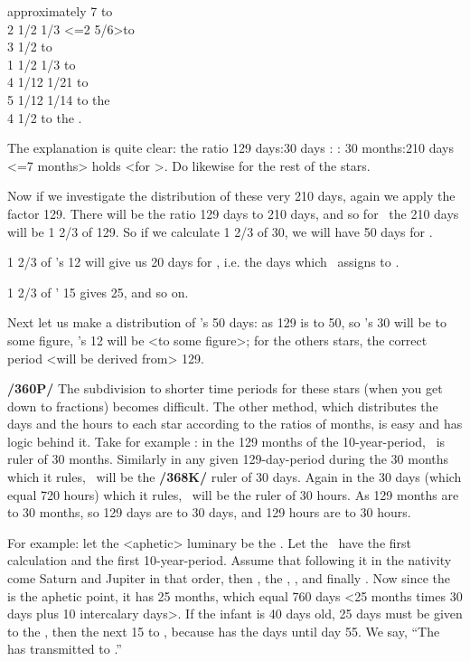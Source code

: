 \noindent approximately 7 to \Saturn \\
2 1/2 1/3 <=2 5/6>to \Jupiter \\
3 1/2 to \Mars \\
1 1/2 1/3 to \Venus \\
4 1/12 1/21 to \Mercury \\
5 1/12 1/14 to the \Moon \\
4 1/2 to the \Sun. 

The explanation is quite clear: 
the ratio 129 days:30 days : : 30 months:210 days <=7 months>
holds <for \Saturn>. Do likewise for the rest of the stars.

Now if we investigate the distribution of these very 210 days, again we apply the factor 129. There will be the ratio 129 days to 210 days, and so for \Saturn\, the 210 days will be 1 2/3 of 129. So if we
calculate 1 2/3 of 30, we will have 50 days for \Saturn. 

1 2/3 of \Jupiter’s 12 will give us 20 days for \Jupiter, i.e. the days which \Saturn\, assigns to \Jupiter. 

1 2/3 of \Mars’ 15 gives 25, and so on.

Next let us make a distribution of \Saturn’s 50 days: as 129 is to 50, so \Saturn’s 30 will be to some figure, \Jupiter’s 12 will be <to some figure>; for the others stars, the correct period <will be derived from> 129.

\textbf{/360P/} The subdivision to shorter time periods for these stars (when you get down to fractions) becomes difficult. The other method, which distributes the days and the hours to each star according to the ratios of months, is easy and has logic behind it. Take for example \Saturn: in the 129 months of the 10-year-period, \Saturn\, is ruler of 30 months. Similarly in any given 129-day-period during the 30 months which it rules, \Saturn\, will be the \textbf{/368K/} ruler of 30 days. Again in the 30 days (which equal 720 hours) which it rules, \Saturn\, will be the ruler of 30 hours. As 129 months are to 30 months, so 129 days are to 30 days, and 129 hours are to 30 hours. 

For example: let the <aphetic> luminary be the \Moon. Let the \Moon\, have the first calculation and the first 10-year-period. Assume that following it in the nativity come Saturn and Jupiter in that order, then \Mars, the \Sun, \Venus, and finally \Mercury. Now since the \Moon\, is the aphetic point, it has 25 months, which equal 760 days <25 months times 30 days plus 10 intercalary days>. If the infant is 40 days old, 25 days must be given to the \Moon, then the next 15 to \Saturn, because \Saturn has the days until day 55. We say, “The \Moon\, has transmitted to \Saturn.” 

